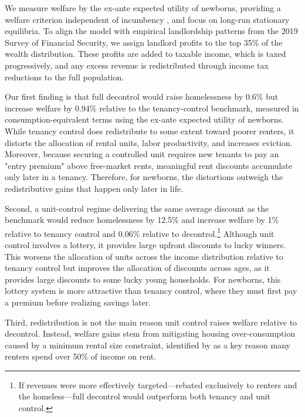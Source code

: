 \documentclass[parskip=full]{article}
\begin{document}
We measure welfare by the ex-ante expected utility of newborns, providing a welfare criterion independent of incumbency \citep{ralws-1971,conesa-et-al,gkkoc}, and focus on long-run stationary equilibria. To align the model with empirical landlordship patterns from the 2019 Survey of Financial Security, we assign landlord profits to the top 35\% of the wealth distribution. These profits are added to taxable income, which is taxed progressively, and any excess revenue is redistributed through income tax reductions to the full population.

Our first finding is that full decontrol would raise homelessness by 0.6\% but increase welfare by 0.94\% relative to the tenancy-control benchmark, measured in consumption-equivalent terms using the ex-ante expected utility of newborns. While tenancy control does redistribute to some extent toward poorer renters, it distorts the allocation of rental units, labor productivity, and increases eviction. Moreover, because securing a controlled unit requires new tenants to pay an "entry premium" above free-market rents, meaningful rent discounts accumulate only later in a tenancy. Therefore, for newborns, the distortions outweigh the redistributive gains that happen only later in life.

Second, a unit-control regime delivering the same average discount as the benchmark would reduce homelessness by 12.5\% and increase welfare by 1\% relative to tenancy control and 0.06\% relative to decontrol.\footnote{If revenues were more effectively targeted—rebated exclusively to renters and the homeless—full decontrol would outperform both tenancy and unit control.} Although unit control involves a lottery, it provides large upfront discounts to lucky winners. This worsens the allocation of units across the income distribution relative to tenancy control but improves the allocation of discounts across ages, as it provides large discounts to some lucky young households. For newborns, this lottery system is more attractive than tenancy control, where they must first pay a premium before realizing savings later.

Third, redistribution is not the main reason unit control raises welfare relative to decontrol. Instead, welfare gains stem from mitigating housing over-consumption caused by a minimum rental size constraint, identified by \citet{rs-2023} as a key reason many renters spend over 50\% of income on rent. 
\end{document}
